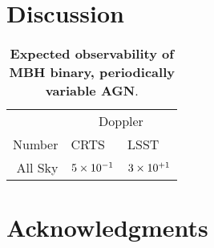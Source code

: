 \documentclass[useAMS, usenatbib]{mnras}
\begin{document}
\section{Discussion}
    \label{sec:disc}

        \renewcommand{\arraystretch}{2.0}
        \setlength{\tabcolsep}{4pt}
        \begin{table*}
            \begin{center}

            \begin{tabular}{ r | l l |}
                                & \multicolumn{2}{c|}{Doppler}         \\
            Number              & CRTS         & LSST                  \\ \hline
            All Sky		        & $5\times\nobreak10^{-1}$    & $3\times\nobreak10^{+1}$             \\
            \end{tabular}

            \caption{\textbf{Expected observability of MBH binary, periodically variable AGN}.}
            \label{tab:rates}
            \end{center}
        \end{table*}


\section*{Acknowledgments}


\let\oldUrl\url
\renewcommand{\url}[1]{\href{#1}{Link}}

\quad{}

% 



\onecolumn
\clearpage

\appendix

    \section{}
    \label{sec:app}

    \twocolumn

    \label{lastpage}
\end{document}
